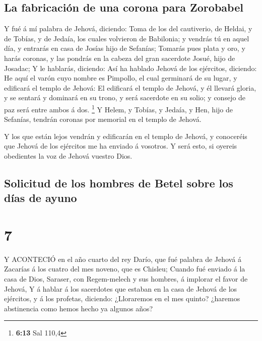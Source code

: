 \hypertarget{la-fabricaciuxf3n-de-una-corona-para-zorobabel}{%
\subsection{La fabricación de una corona para
Zorobabel}\label{la-fabricaciuxf3n-de-una-corona-para-zorobabel}}

 Y fué á mí palabra de Jehová, diciendo:  Toma
de los del cautiverio, de Heldai, y de Tobías, y de Jedaía, los cuales
volvieron de Babilonia; y vendrás tú en aquel día, y entrarás en casa de
Josías hijo de Sefanías;  Tomarás pues plata y oro, y harás
coronas, y las pondrás en la cabeza del gran sacerdote Josué, hijo de
Josadac;  Y le hablarás, diciendo: Así ha hablado Jehová de
los ejércitos, diciendo: He aquí el varón cuyo nombre es Pimpollo, el
cual germinará de su lugar, y edificará el templo de Jehová:
 El edificará el templo de Jehová, y él llevará gloria, y
se sentará y dominará en su trono, y será sacerdote en su solio; y
consejo de paz será entre ambos á dos. \footnote{\textbf{6:13} Sal 110,4}
 Y Helem, y Tobías, y Jedaía, y Hen, hijo de Sefanías,
tendrán coronas por memorial en el templo de Jehová.

 Y los que están lejos vendrán y edificarán en el templo de
Jehová, y conoceréis que Jehová de los ejércitos me ha enviado á
vosotros. Y será esto, si oyereis obedientes la voz de Jehová vuestro
Dios.

\hypertarget{solicitud-de-los-hombres-de-betel-sobre-los-duxedas-de-ayuno}{%
\subsection{Solicitud de los hombres de Betel sobre los días de
ayuno}\label{solicitud-de-los-hombres-de-betel-sobre-los-duxedas-de-ayuno}}

\hypertarget{section-6}{%
\section{7}\label{section-6}}

 Y ACONTECIÓ en el año cuarto del rey Darío, que fué palabra
de Jehová á Zacarías á los cuatro del mes noveno, que es Chisleu;
 Cuando fué enviado á la casa de Dios, Saraser, con
Regem-melech y sus hombres, á implorar el favor de Jehová, 
Y á hablar á los sacerdotes que estaban en la casa de Jehová de los
ejércitos, y á los profetas, diciendo: ¿Lloraremos en el mes quinto?
¿haremos abstinencia como hemos hecho ya algunos años?

